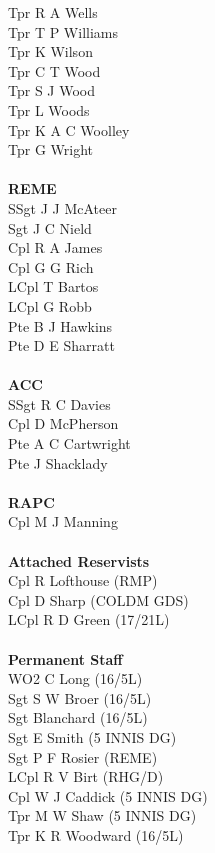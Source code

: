 \begin{multicols}{2}
  Tpr R A Wells \\
  Tpr T P Williams \\
  Tpr K Wilson \\
  Tpr C T Wood \\
  Tpr S J Wood \\
  Tpr L Woods \\
  Tpr K A C Woolley \\
  Tpr G Wright \\
  \\
  \textbf{REME} \\
  SSgt J J McAteer \\
  Sgt J C Nield \\
  Cpl R A James \\
  Cpl G G Rich \\
  LCpl T Bartos \\
  LCpl G Robb \\
  Pte B J Hawkins \\
  Pte D E Sharratt \\
  \\
  \textbf{ACC} \\
  SSgt R C Davies \\
  Cpl D McPherson \\
  Pte A C Cartwright \\
  Pte J Shacklady \\
  \\
  \textbf{RAPC} \\
  Cpl M J Manning \\
  \\
  \textbf{Attached Reservists} \\
  Cpl R Lofthouse (RMP) \\
  Cpl D Sharp (COLDM GDS) \\
  LCpl R D Green (17/21L) \\
  \\
  \textbf{Permanent Staff} \\
  WO2 C Long (16/5L) \\
  Sgt S W Broer (16/5L) \\
  Sgt Blanchard (16/5L) \\
  Sgt E Smith (5 INNIS DG) \\
  Sgt P F Rosier (REME) \\
  LCpl R V Birt (RHG/D) \\
  Cpl W J Caddick (5 INNIS DG) \\
  Tpr M W Shaw (5 INNIS DG) \\
  Tpr K R Woodward (16/5L) \\
\end{multicols}
